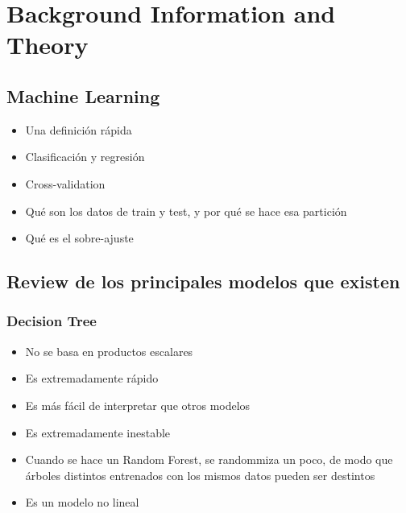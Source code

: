 
\chapter{Background Information and Theory} %

\label{Chapter2} %


\section{Machine Learning}
\begin{note}
  \begin{itemize}
    \item Una definición rápida
    \item Clasificación y regresión
    \item Cross-validation
    \item Qué son los datos de train y test, y por qué se hace esa partición
    \item Qué es el sobre-ajuste
  \end{itemize}
\end{note}

\begin{note}
  \section{Review de los principales modelos que existen}
\end{note}
  \subsection{Decision Tree}
  \begin{note}
    \begin{itemize}
      \item No se basa en productos escalares
      \item Es extremadamente rápido
      \item Es más fácil de interpretar que otros modelos
      \item Es extremadamente inestable
      \item Cuando se hace un Random Forest, se randommiza un poco, de modo que
      árboles distintos entrenados con los mismos datos pueden ser destintos
      \item Es un modelo no lineal
    \end{itemize}
  \end{note}

